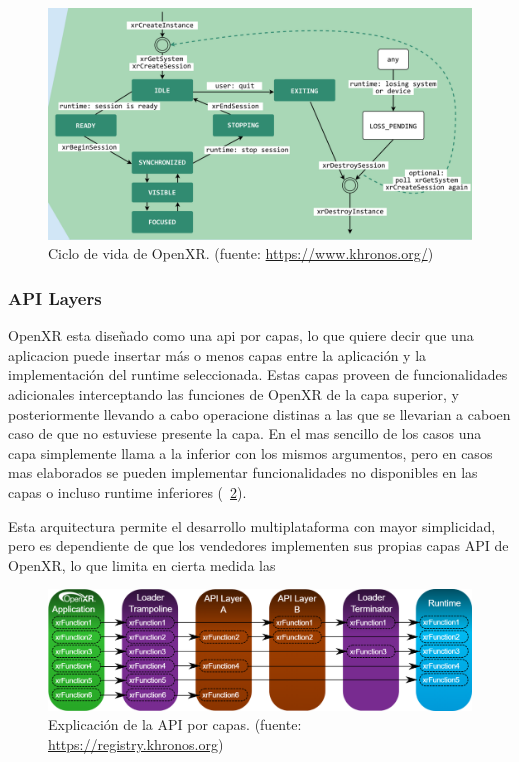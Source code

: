 \begin{figure}
  \centering
  \includegraphics[width=1.0\textwidth]{imaxes/openXR_life_cycle.png}
  \caption{Ciclo de vida de OpenXR. (fuente: \href{https://www.khronos.org/}{https://www.khronos.org/})}
  \label{fig:openxrlifecycle}
\end{figure}

\subsubsection{API Layers}
OpenXR esta diseñado como una \acrshort{api} por capas, lo que quiere decir que una aplicacion puede insertar más o menos capas entre la aplicación y la implementación del runtime seleccionada. Estas capas proveen de funcionalidades adicionales interceptando las funciones de OpenXR de la capa superior, y posteriormente llevando a cabo operacione distinas a las que se llevarian a caboen caso de que no estuviese presente la capa. En el mas sencillo de los casos una capa simplemente llama a la inferior con los mismos argumentos, pero en casos mas elaborados se pueden implementar funcionalidades no disponibles en las capas o incluso runtime inferiores (\figurename~\ref{fig:openxrapilayer}).

Esta arquitectura permite el desarrollo multiplataforma con mayor simplicidad, pero es dependiente de que los vendedores implementen sus propias capas API de OpenXR, lo que limita en cierta medida las 

\begin{figure}
  \centering
  \includegraphics[width=1.0\textwidth]{imaxes/openxr_api_layer_graph.png}
  \caption{Explicación de la API por capas. (fuente: \href{https://registry.khronos.org/OpenXR/specs/1.0/loader.html}{https://registry.khronos.org})}
  \label{fig:openxrapilayer}
\end{figure}

